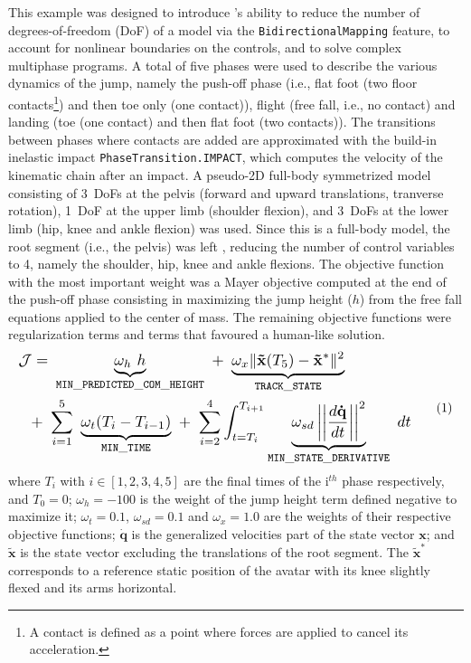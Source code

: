 This example was designed to introduce \bioptim's ability to reduce the number of degrees-of-freedom (DoF) of a model via the \texttt{BidirectionalMapping} feature, to account for nonlinear boundaries on the controls, and to solve complex multiphase programs.
A total of five phases were used to describe the various dynamics of the jump, namely the push-off phase (i.e., flat foot (two floor contacts\footnote{A contact is defined as a point where forces are applied to cancel its acceleration.}) and then toe only (one contact)), flight (free fall, i.e., no contact) and landing (toe (one contact) and then flat foot (two contacts)).
The transitions between phases where contacts are added are approximated with the build-in inelastic impact \texttt{PhaseTransition.IMPACT}, which computes the velocity of the kinematic chain after an impact.
A pseudo-2D full-body symmetrized model consisting of 3~DoFs at the pelvis (forward and upward translations, tranverse rotation), 1~DoF at the upper limb (shoulder flexion), and 3~DoFs at the lower limb (hip, knee and ankle flexion) was used.
Since this is a full-body model, the root segment (i.e., the pelvis) was left , reducing the number of control variables to 4, namely the shoulder, hip, knee and ankle flexions. 
The objective function with the most important weight was a Mayer objective computed at the end of the push-off phase consisting in maximizing the jump height ($h$) from the free fall equations applied to the center of mass.
The remaining objective functions were regularization terms and terms that favoured a human-like solution. 
\[ 
  \resizebox{0.90\columnwidth}{!}{$ 
  \begin{aligned}
  \mathcal{J} = &~\underbrace{\omega_h~h}_{\mathtt{MIN\_PREDICTED\_COM\_HEIGHT}}~+~\underbrace{\omega_{x} \| \mathbf{\tilde{x}}(T_5) - \mathbf{\tilde{x}}^*\|^2}_{\mathtt{TRACK\_STATE}}\\
  +~&\sum^5_{i=1}~\underbrace{\omega_{t}(T_i - T_{i-1})}_{\mathtt{MIN\_TIME}}~
    +~\sum_{i=2}^4\int_{t=T_i}^{T_{i+1}}\underbrace{\omega_{sd}\left|\left|\frac{d\mathbf{\dot{q}}}{dt}\right|\right|^2}_{\mathtt{MIN\_STATE\_DERIVATIVE}}~dt
  \end{aligned}  
  $} 
  \addtag  
  \label{eq:cost_jumper}
\]
where $T_i$ with $i \in [1, 2, 3, 4, 5]$ are the final times of the i$^{th}$ phase respectively, and $T_0=0$; 
$\omega_h=-100$ is the weight of the jump height term defined negative to maximize it; 
$\omega_t=0.1$, $\omega_{sd}=0.1$ and $\omega_x=1.0$ are the weights of their respective objective functions; 
$\mathbf{\dot{q}}$ is the generalized velocities part of the state vector $\mathbf{x}$; 
and $\mathbf{\tilde{x}}$ is the state vector excluding the translations of the root segment. 
The $\mathbf{\tilde{x}}^*$ corresponds to a reference static position of the avatar with its knee slightly flexed and its arms horizontal.

